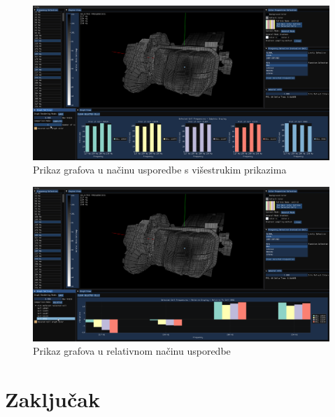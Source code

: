 \documentclass[times, utf8, diplomski]{fer}
\begin{document}
\begin{figure} [H]
	\centering
    \includegraphics[width=\textwidth]{demonstration/selected_cell_subplots.png}
    \caption{Prikaz grafova u načinu usporedbe s višestrukim prikazima}
    \label{fig:subplots-graph-comp}
\end{figure}

\begin{figure} [H]
	\centering
    \includegraphics[width=\textwidth]{demonstration/selected_cell_relative.png}
    \caption{Prikaz grafova u relativnom načinu usporedbe}
    \label{fig:relative-graph-comp}
\end{figure}

\chapter{Zaključak}
\end{document}
